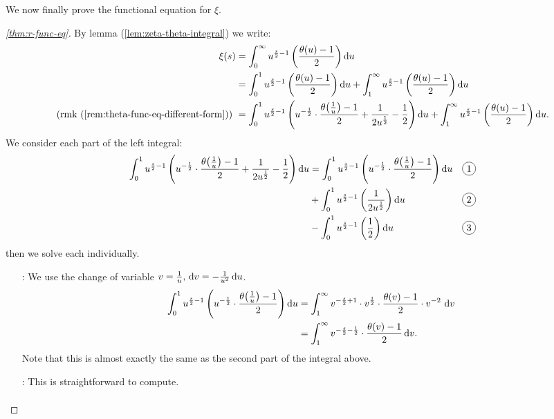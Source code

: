 We now finally prove the functional equation for $\xi$.\\

\begin{proof}[\ref{thm:r-func-eq}]
By lemma (\ref{lem:zeta-theta-integral}) we write:
\begin{align*}
    \xi(s) &= \int_0^\infty u^{\frac{s}{2} - 1} \br{\frac{\theta(u) - 1}{2}} \dif u\\
    &= \int_0^1 u^{\frac{s}{2} - 1} \br{\frac{\theta(u) - 1}{2}} \dif u + \int_1^\infty u^{\frac{s}{2} - 1} \br{\frac{\theta(u) - 1}{2}} \dif u\\
    \text{(rmk (\ref{rem:theta-func-eq-different-form})) } &= \int_0^1 u^{\frac{s}{2} - 1} \br{u^{- \frac{1}{2}} \cdot \frac{\theta\big(\tfrac{1}{u}\big) - 1}{2} + \frac{1}{2 u^{\frac{1}{2}}} - \frac{1}{2}} \dif u + \int_1^\infty u^{\frac{s}{2} - 1} \br{\frac{\theta(u) - 1}{2}} \dif u.
\end{align*}
We consider each part of the left integral:
\begin{align*}
    \int_0^1 u^{\frac{s}{2} - 1} \br{u^{- \frac{1}{2}} \cdot \frac{\theta\big(\tfrac{1}{u}\big) - 1}{2} + \frac{1}{2 u^{\frac{1}{2}}} - \frac{1}{2}} \dif u &= \int_0^1 u^{\frac{s}{2} - 1} \br{u^{- \frac{1}{2}} \cdot \frac{\theta\big(\tfrac{1}{u}\big) - 1}{2}} \dif u && \circled{1} \\& + \int_0^1 u^{\frac{s}{2} - 1} \br{\frac{1}{2 u^{\frac{1}{2}}}} \dif u && \circled{2} \\& - \int_0^1 u^{\frac{s}{2} - 1} \br{\frac{1}{2}} \dif u && \circled{3}
\end{align*}
then we solve each individually.
\begin{enumerate}
    \item[\circled{1} :] We use the change of variable $v = \frac{1}{u}, \, \dif v = - \frac{1}{u^2} \dif u$.
    \begin{align*}
        \int_0^1 u^{\frac{s}{2} - 1} \br{u^{- \frac{1}{2}} \cdot \frac{\theta\big(\tfrac{1}{u}\big) - 1}{2}} \dif u &= \int_1^\infty v^{-\frac{s}{2} + 1} \cdot v^{ \frac{1}{2}} \cdot \frac{\theta (v ) - 1}{2} \cdot v^{-2} \, \dif v\\
        &= \int_1^\infty v^{-\frac{s}{2} - \frac{1}{2}} \cdot \frac{\theta (v ) - 1}{2} \dif v.
    \end{align*}
    Note that this is almost exactly the same as the second part of the integral above.
    \item[\circled{2} :] This is straightforward to compute.
    \begin{align*}

\end{align*}
\end{enumerate}
\end{proof}
